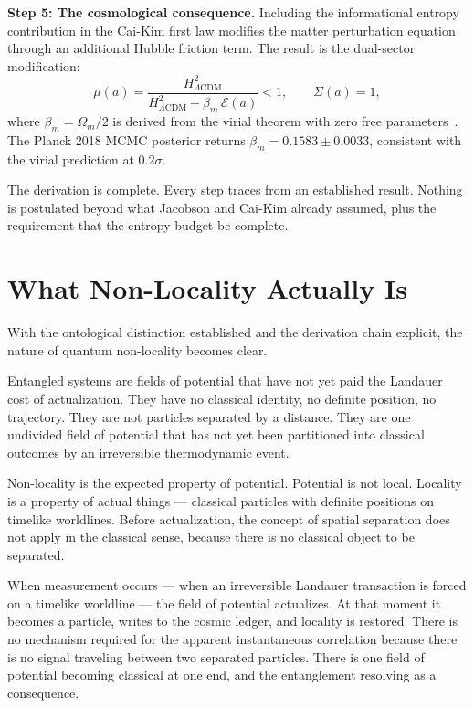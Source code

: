 \documentclass[12pt,a4paper]{article}
\begin{document}
\textbf{Step 5: The cosmological consequence.} Including the informational
entropy contribution in the Cai-Kim first law modifies the matter
perturbation equation through an additional Hubble friction term. The
result is the dual-sector modification:
\begin{equation}
\mu(a) = \frac{H^2_{\Lambda\mathrm{CDM}}}{H^2_{\Lambda\mathrm{CDM}}
+ \beta_m\,\mathcal{E}(a)} < 1, \qquad \Sigma(a) = 1,
\label{eq:sector}
\end{equation}
where $\beta_m = \Omega_m/2$ is derived from the virial theorem with zero
free parameters~\citep{IAM_theory}. The Planck 2018 MCMC posterior
returns $\beta_m = 0.1583 \pm 0.0033$, consistent with the virial
prediction at $0.2\sigma$.

The derivation is complete. Every step traces from an established result.
Nothing is postulated beyond what Jacobson and Cai-Kim already assumed,
plus the requirement that the entropy budget be complete.

\section{What Non-Locality Actually Is}
\label{sec:nonlocality}

With the ontological distinction established and the derivation chain
explicit, the nature of quantum non-locality becomes clear.

Entangled systems are fields of potential that have not yet paid the
Landauer cost of actualization. They have no classical identity, no
definite position, no trajectory. They are not particles separated by a
distance. They are one undivided field of potential that has not yet been
partitioned into classical outcomes by an irreversible thermodynamic
event.

Non-locality is the expected property of potential. Potential is not
local. Locality is a property of actual things --- classical particles with
definite positions on timelike worldlines. Before actualization, the
concept of spatial separation does not apply in the classical sense,
because there is no classical object to be separated.

When measurement occurs --- when an irreversible Landauer transaction is
forced on a timelike worldline --- the field of potential actualizes. At
that moment it becomes a particle, writes to the cosmic ledger, and
locality is restored. There is no mechanism required for the apparent
instantaneous correlation because there is no signal traveling between
two separated particles. There is one field of potential becoming
classical at one end, and the entanglement resolving as a consequence.
\end{document}
